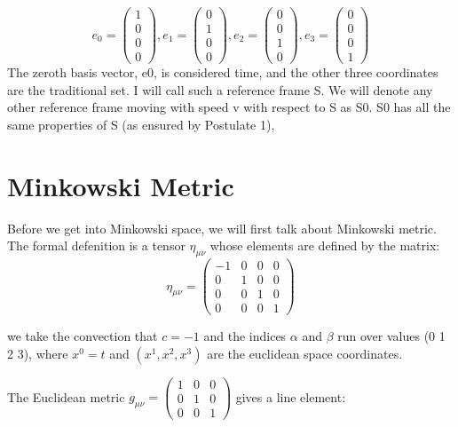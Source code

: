 \documentclass[11]{article}
\begin{document}
$$
e_0=\begin{pmatrix}
1\\
0\\
0\\
0
\end{pmatrix}
,e_1=\begin{pmatrix}
0\\
1\\
0\\
0
\end{pmatrix}
,e_2=\begin{pmatrix}
0\\
0\\
1\\
0
\end{pmatrix}
,e_3=\begin{pmatrix}
0\\
0\\
0\\
1
\end{pmatrix}
$$
The zeroth basis vector, e0, is considered time, and the other three coordinates are the traditional set.
I will call such a reference frame S. We will denote any other reference frame moving with speed v with
respect to S as S0. S0 has all the same properties of S (as ensured by Postulate 1),

\section{Minkowski Metric}

Before we get into Minkowski space, we will first talk about Minkowski metric. The formal defenition is a tensor $\eta_{\mu \nu}$ whose elements are defined by the matrix:
\[
\eta_{\mu \nu}=\begin{pmatrix}
-1&0&0&0\\
0&1&0&0\\
0&0&1&0\\
0&0&0&1
\end{pmatrix} 
\]

\noindent we take the convection that $c=-1$ and the indices $\alpha$ and $\beta$ run over values (0 1 2 3), where $x^0=t$ and $(x^1,x^2,x^3)$ are the euclidean space coordinates.

\noindent The Euclidean metric $g_{\mu \nu}=\begin{pmatrix}
1&0&0\\
0&1&0\\
0&0&1
\end{pmatrix}$ gives a line element:
\end{document}
